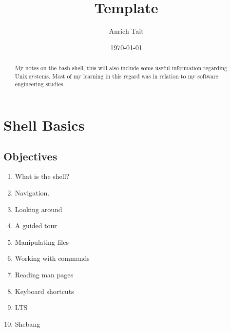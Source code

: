 \documentclass[12pt, letterpaper]{report}
\title{Template}
\author{Anrich Tait}
\date{\today}
\begin{document}
\restoregeometry %
\nopagecolor%

\begin{abstract}
	My notes on the bash shell, this will also include some useful information 
	regarding Unix systems. Most of my learning in this regard was in relation
	to my software engineering studies.
\end{abstract}

\tableofcontents

\chapter{Shell Basics}

\section{Objectives}
\begin{enumerate}
	\item What is the shell?
	\item Navigation.
	\item Looking around
	\item A guided tour
	\item Manipulating files
	\item Working with commands
	\item Reading man pages
	\item Keyboard shortcuts
	\item LTS
	\item Shebang
\end{enumerate}
\end{document}
